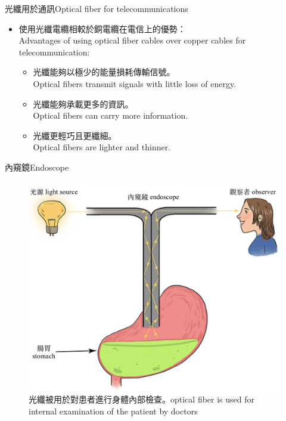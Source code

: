 \documentclass[beamer=true]{standalone}
\begin{document}
\begin{frame}{光纖用於通訊Optical fiber for telecommunications}
    \begin{itemize}
        \item 使用光纖電纜相較於銅電纜在電信上的優勢：\\Advantages of using optical fiber cables over copper cables for telecommunication:
        \begin{itemize}
            \item 光纖能夠以極少的能量損耗傳輸信號。\\Optical fibers transmit signals with little loss of energy.
            \item 光纖能夠承載更多的資訊。\\Optical fibers can carry more information.
            \item 光纖更輕巧且更纖細。\\Optical fibers are lighter and thinner.
        \end{itemize}
    \end{itemize}
\end{frame}

\begin{frame}{內窺鏡Endoscope}
    \begin{figure}
        \centering
        \includegraphics[width=.7\linewidth]{assets/d9j82323d3.png}
        \caption{光纖被用於對患者進行身體內部檢查。optical fiber is used for internal examination of the patient by doctors}
    \end{figure}
\end{frame}
\end{document}
